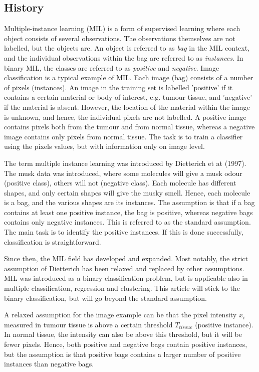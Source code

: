 \subsection{History} 


Multiple-instance learning (MIL) is a form of supervised learning where each object consists of several observations.
The observations themselves are not labelled, but the objects are.  
An object is referred to as {\it bag} in the MIL context, and the individual observations within the bag are referred to as {\it instances}.
In binary MIL, the classes are referred to as {\it positive} and {\it negative}. 
Image classification is a typical example of MIL. 
Each image (bag) consists of a number of pixels (instances).
An image in the training set is labelled 'positive' if it contains a certain material or body of interest, e.g. tumour tissue, and 'negative' if the material is absent. 
However, the location of the material within the image is unknown, and hence, the individual pixels are not labelled. 
A positive image contains pixels both from the tumour and from normal tissue, whereas a negative image contains only pixels from normal tissue. 
The task is to train a classifier using the pixels values, but with information only on image level. 

The term multiple instance learning was introduced by {\color{green} Dietterich et at (1997)}. 
The musk data was introduced, where some molecules will give a musk odour (positive class), others will not (negative class). 
Each molecule has different shapes, and only certain shapes will give the musky smell. 
Hence, each molecule is a bag, and the various shapes are its instances. 
The assumption is that if a bag contains at least one positive instance, the bag is positive, whereas negative bags contains only negative instances. 
This is referred to as the standard assumption. 
The main task is to identify the positive instances. 
If this is done successfully, classification is straightforward.

Since then, the MIL field has developed and expanded. 
Most notably, the strict assumption of Dietterich has been relaxed and replaced by other assumptions. 
MIL was introduced as a binary classification problem, but is applicable also in multiple classification, regression and clustering. 
This article will stick to the binary classification, but will go beyond the standard assumption. 

A relaxed assumption for the image example can be that the pixel intensity $x_i$ measured in tumour tissue is above a certain threshold $T_{tissue}$ (positive instance).  
In normal tissue, the intensity can also be above this threshold, but it will be fewer pixels. 
Hence, both positive and negative bags contain positive instances, but the assumption is that positive bags contains a larger number of positive instances than negative bags. 

